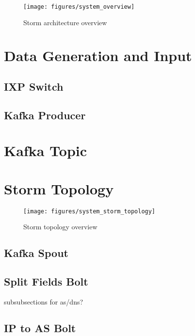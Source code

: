 \begin{figure}[H]
\centering
\texttt{[image: figures/system\_overview]}
\caption{Storm architecture overview}
\label{figure:system_overview}
\end{figure}


\section{Data Generation and Input}

\subsection{IXP Switch}



\subsection{Kafka Producer}




\section{Kafka Topic}




\section{Storm Topology}

\begin{figure}[H]
\centering
\texttt{[image: figures/system\_storm\_topology]}
\caption{Storm topology overview}
\label{figure:system_storm_topology}
\end{figure}

\subsection{Kafka Spout}



\subsection{Split Fields Bolt}

subsubsections for as/dns?

\subsection{IP to AS Bolt}

